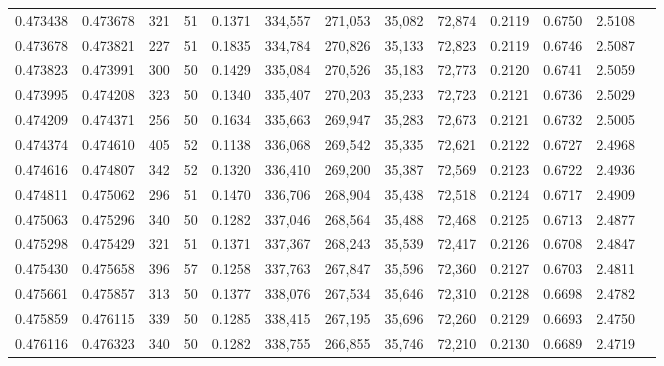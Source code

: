 \begin{tabular}{rrrrrrrrrrrrr}
0.473438 & 0.473678 &   321 &  51 &                                     0.1371 & 334,557 & 271,053 &  35,082 &  72,874 & 0.2119 & 0.6750 & 2.5108 \\
0.473678 & 0.473821 &   227 &  51 &                                     0.1835 & 334,784 & 270,826 &  35,133 &  72,823 & 0.2119 & 0.6746 & 2.5087 \\
0.473823 & 0.473991 &   300 &  50 &                                     0.1429 & 335,084 & 270,526 &  35,183 &  72,773 & 0.2120 & 0.6741 & 2.5059 \\
0.473995 & 0.474208 &   323 &  50 &                                     0.1340 & 335,407 & 270,203 &  35,233 &  72,723 & 0.2121 & 0.6736 & 2.5029 \\
0.474209 & 0.474371 &   256 &  50 &                                     0.1634 & 335,663 & 269,947 &  35,283 &  72,673 & 0.2121 & 0.6732 & 2.5005 \\
0.474374 & 0.474610 &   405 &  52 &                                     0.1138 & 336,068 & 269,542 &  35,335 &  72,621 & 0.2122 & 0.6727 & 2.4968 \\
0.474616 & 0.474807 &   342 &  52 &                                     0.1320 & 336,410 & 269,200 &  35,387 &  72,569 & 0.2123 & 0.6722 & 2.4936 \\
0.474811 & 0.475062 &   296 &  51 &                                     0.1470 & 336,706 & 268,904 &  35,438 &  72,518 & 0.2124 & 0.6717 & 2.4909 \\
0.475063 & 0.475296 &   340 &  50 &                                     0.1282 & 337,046 & 268,564 &  35,488 &  72,468 & 0.2125 & 0.6713 & 2.4877 \\
0.475298 & 0.475429 &   321 &  51 &                                     0.1371 & 337,367 & 268,243 &  35,539 &  72,417 & 0.2126 & 0.6708 & 2.4847 \\
0.475430 & 0.475658 &   396 &  57 &                                     0.1258 & 337,763 & 267,847 &  35,596 &  72,360 & 0.2127 & 0.6703 & 2.4811 \\
0.475661 & 0.475857 &   313 &  50 &                                     0.1377 & 338,076 & 267,534 &  35,646 &  72,310 & 0.2128 & 0.6698 & 2.4782 \\
0.475859 & 0.476115 &   339 &  50 &                                     0.1285 & 338,415 & 267,195 &  35,696 &  72,260 & 0.2129 & 0.6693 & 2.4750 \\
0.476116 & 0.476323 &   340 &  50 &                                     0.1282 & 338,755 & 266,855 &  35,746 &  72,210 & 0.2130 & 0.6689 & 2.4719 \\

\end{tabular}
